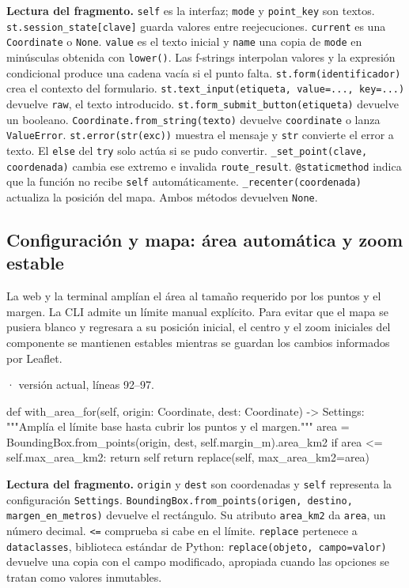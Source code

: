 \documentclass[11pt,a4paper]{article}
\begin{document}
\textbf{Lectura del fragmento.} \texttt{self} es la interfaz; \texttt{mode} y \texttt{point\_key} son textos. \texttt{st.session\_state[clave]} guarda valores entre reejecuciones. \texttt{current} es una \texttt{Coordinate} o \texttt{None}. \texttt{value} es el texto inicial y \texttt{name} una copia de \texttt{mode} en minúsculas obtenida con \texttt{lower()}. Las f-strings interpolan valores y la expresión condicional produce una cadena vacía si el punto falta. \texttt{st.form(identificador)} crea el contexto del formulario. \texttt{st.text\_input(etiqueta, value=..., key=...)} devuelve \texttt{raw}, el texto introducido. \texttt{st.form\_submit\_button(etiqueta)} devuelve un booleano. \texttt{Coordinate.from\_string(texto)} devuelve \texttt{coordinate} o lanza \texttt{ValueError}. \texttt{st.error(str(exc))} muestra el mensaje y \texttt{str} convierte el error a texto. El \texttt{else} del \texttt{try} solo actúa si se pudo convertir. \texttt{\_set\_point(clave, coordenada)} cambia ese extremo e invalida \texttt{route\_result}. \texttt{@staticmethod} indica que la función no recibe \texttt{self} automáticamente. \texttt{\_recenter(coordenada)} actualiza la posición del mapa. Ambos métodos devuelven \texttt{None}.


\subsection{Configuración y mapa: área automática y zoom estable}
La web y la terminal amplían el área al tamaño requerido por los puntos y el margen. La CLI admite un límite manual explícito. Para evitar que el mapa se pusiera blanco y regresara a su posición inicial, el centro y el zoom iniciales del componente se mantienen estables mientras se guardan los cambios informados por Leaflet.

\smallskip
{\footnotesize\texttt{} · versión actual, líneas 92--97.}\par
\begin{Codigo}[firstnumber=92]
    def with_area_for(self, origin: Coordinate, dest: Coordinate) -> Settings:
        """Amplía el límite base hasta cubrir los puntos y el margen."""
        area = BoundingBox.from_points(origin, dest, self.margin_m).area_km2
        if area <= self.max_area_km2:
            return self
        return replace(self, max_area_km2=area)
\end{Codigo}

\textbf{Lectura del fragmento.} \texttt{origin} y \texttt{dest} son coordenadas y \texttt{self} representa la configuración \texttt{Settings}. \texttt{BoundingBox.from\_points(origen, destino, margen\_en\_metros)} devuelve el rectángulo. Su atributo \texttt{area\_km2} da \texttt{area}, un número decimal. \texttt{\textless{}=} comprueba si cabe en el límite. \texttt{replace} pertenece a \texttt{dataclasses}, biblioteca estándar de Python: \texttt{replace(objeto, campo=valor)} devuelve una copia con el campo modificado, apropiada cuando las opciones se tratan como valores inmutables.
\end{document}
